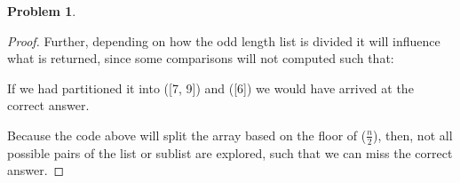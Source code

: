 \documentclass[11pt]{article}
\theoremstyle{definition}
\theoremstyle{definition}
\newtheorem{required}{Problem}
\theoremstyle{definition}
\begin{document}
\begin{required}
\begin{proof}
Further, depending on how the odd length list is divided it will influence what is returned, since some comparisons will not computed such that: 
\begin{center}
If we had partitioned it into ([7, 9]) and ([6]) we would have arrived at the correct answer.
\end{center}
Because the code above will split the array based on the floor of ($\frac{n}{2}$), then, not all possible pairs of the list or sublist are explored, such that we can miss the correct answer.
\end{proof}
\end{required}



\end{document}

